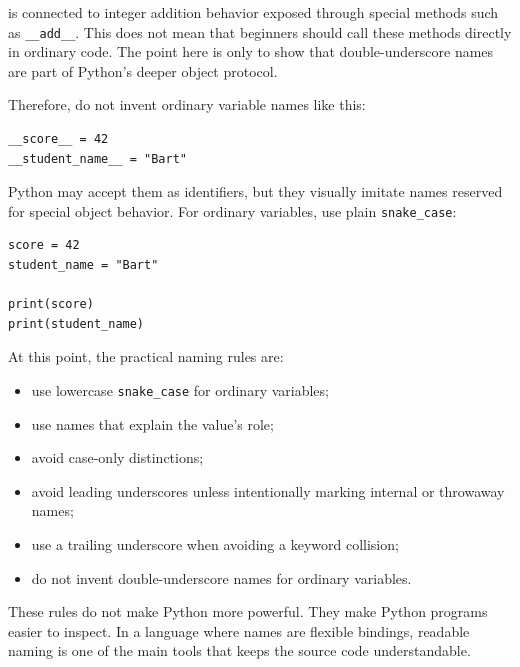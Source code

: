 is connected to integer addition behavior exposed through special methods such as \texttt{\_\_add\_\_}. This does not mean that beginners should call these methods directly in ordinary code. The point here is only to show that double-underscore names are part of Python's deeper object protocol.

Therefore, do not invent ordinary variable names like this:

\begin{verbatim}
__score__ = 42
__student_name__ = "Bart"
\end{verbatim}

Python may accept them as identifiers, but they visually imitate names reserved for special object behavior. For ordinary variables, use plain \texttt{snake\_case}:

\begin{verbatim}
score = 42
student_name = "Bart"

print(score)
print(student_name)
\end{verbatim}

At this point, the practical naming rules are:

\begin{itemize}
    \item use lowercase \texttt{snake\_case} for ordinary variables;
    \item use names that explain the value's role;
    \item avoid case-only distinctions;
    \item avoid leading underscores unless intentionally marking internal or throwaway names;
    \item use a trailing underscore when avoiding a keyword collision;
    \item do not invent double-underscore names for ordinary variables.
\end{itemize}

These rules do not make Python more powerful. They make Python programs easier to inspect. In a language where names are flexible bindings, readable naming is one of the main tools that keeps the source code understandable.
